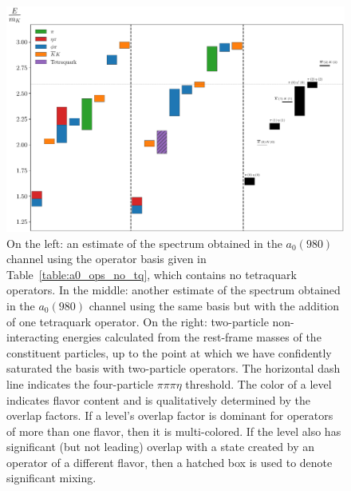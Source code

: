 \begin{figure}
  \centering
  \hspace*{-0.5in}\includegraphics[width=\textwidth]{figures/spectrum_a1gm/staircase.pdf}
  \caption[A comparison of spectrum determinations made in the $a_0(980)$ channel.]{On the left: an estimate of the spectrum obtained in the $a_0(980)$ channel using the operator basis given in Table~\ref{table:a0_ops_no_tq}, which contains no tetraquark operators. In the middle: another estimate of the spectrum obtained in the $a_0(980)$ channel using the same basis but with the addition of one tetraquark operator. On the right: two-particle non-interacting energies calculated from the rest-frame masses of the constituent particles, up to the point at which we have confidently saturated the basis with two-particle operators. The horizontal dash line indicates the four-particle $\pi\pi\pi\eta$ threshold. The color of a level indicates flavor content and is qualitatively determined by the overlap factors. If a level's overlap factor is dominant for operators of more than one flavor, then it is multi-colored. If the level also has significant (but not leading) overlap with a state created by an operator of a different flavor, then a hatched box is used to denote significant mixing.}
  \label{fig:a0_spectrum}
\end{figure}